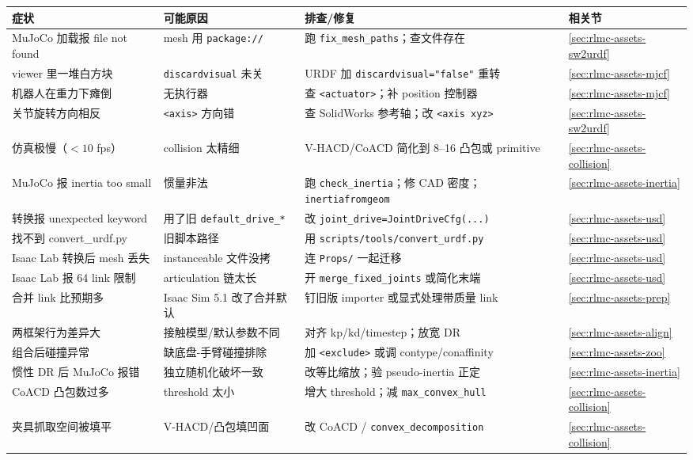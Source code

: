 \begin{center}
\small
\begin{tabular}{@{}p{4.3cm}p{3.4cm}p{4.4cm}l@{}}
\toprule
症状 & 可能原因 & 排查/修复 & 相关节 \\
\midrule
MuJoCo 加载报 file not found & mesh 用 \texttt{package://} & 跑 \texttt{fix\_mesh\_paths}；查文件存在 & \cref{sec:rlmc-assets-sw2urdf} \\
viewer 里一堆白方块 & \texttt{discardvisual} 未关 & URDF 加 \texttt{discardvisual="false"} 重转 & \cref{sec:rlmc-assets-mjcf} \\
机器人在重力下瘫倒 & 无执行器 & 查 \texttt{<actuator>}；补 position 控制器 & \cref{sec:rlmc-assets-mjcf} \\
关节旋转方向相反 & \texttt{<axis>} 方向错 & 查 SolidWorks 参考轴；改 \texttt{<axis xyz>} & \cref{sec:rlmc-assets-sw2urdf} \\
仿真极慢（$<10$ fps） & collision 太精细 & V-HACD/CoACD 简化到 8--16 凸包或 primitive & \cref{sec:rlmc-assets-collision} \\
MuJoCo 报 inertia too small & 惯量非法 & 跑 \texttt{check\_inertia}；修 CAD 密度；\texttt{inertiafromgeom} & \cref{sec:rlmc-assets-inertia} \\
转换报 unexpected keyword & 用了旧 \texttt{default\_drive\_*} & 改 \texttt{joint\_drive=JointDriveCfg(...)} & \cref{sec:rlmc-assets-usd} \\
找不到 convert\_urdf.py & 旧脚本路径 & 用 \texttt{scripts/\allowbreak tools/\allowbreak convert\_urdf.\allowbreak py} & \cref{sec:rlmc-assets-usd} \\
Isaac Lab 转换后 mesh 丢失 & instanceable 文件没拷 & 连 \texttt{Props/} 一起迁移 & \cref{sec:rlmc-assets-usd} \\
Isaac Lab 报 64 link 限制 & articulation 链太长 & 开 \texttt{merge\_fixed\_joints} 或简化末端 & \cref{sec:rlmc-assets-usd} \\
合并 link 比预期多 & Isaac Sim 5.1 改了合并默认 & 钉旧版 importer 或显式处理带质量 link & \cref{sec:rlmc-assets-prep} \\
两框架行为差异大 & 接触模型/默认参数不同 & 对齐 kp/kd/timestep；放宽 DR & \cref{sec:rlmc-assets-align} \\
组合后碰撞异常 & 缺底盘-手臂碰撞排除 & 加 \texttt{<exclude>} 或调 contype/conaffinity & \cref{sec:rlmc-assets-zoo} \\
惯性 DR 后 MuJoCo 报错 & 独立随机化破坏一致 & 改等比缩放；验 pseudo-inertia 正定 & \cref{sec:rlmc-assets-inertia} \\
CoACD 凸包数过多 & threshold 太小 & 增大 threshold；减 \texttt{max\_convex\_hull} & \cref{sec:rlmc-assets-collision} \\
夹具抓取空间被填平 & V-HACD/凸包填凹面 & 改 CoACD / \texttt{convex\_decomposition} & \cref{sec:rlmc-assets-collision} \\
\bottomrule
\end{tabular}
\end{center}

